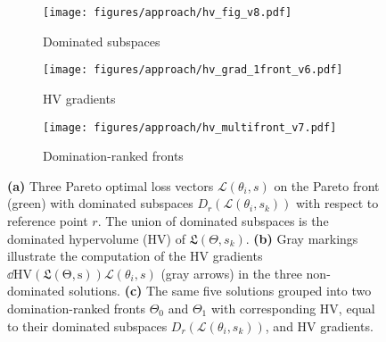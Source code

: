 \begin{figure*}
\begin{subfigure}{0.32\textwidth}
    \centering
    \texttt{[image: figures/approach/hv\_fig\_v8.pdf]}
    \caption{Dominated subspaces}
    \label{fig:hv_intuition}
\end{subfigure}
\begin{subfigure}{0.32\textwidth}
    \centering
    \texttt{[image: figures/approach/hv\_grad\_1front\_v6.pdf]}
    \caption{HV gradients}
    \label{fig:hv_grad_1front}
\end{subfigure}
\begin{subfigure}{0.32\textwidth}
    \centering
    \texttt{[image: figures/approach/hv\_multifront\_v7.pdf]}
    \caption{Domination-ranked fronts}
    \label{fig:hv_grad_intuition}
\end{subfigure}
    \centering
    \caption{\textbf{(a)} Three Pareto optimal loss vectors $\mathcal{L}(\theta_{i},s)$ on the Pareto front (green) with dominated subspaces $D_{r}(\mathcal{L}(\theta_{i},s_{k}))$ with respect to reference point $r$. The union of dominated subspaces is the dominated hypervolume (HV) of $\mathfrak{L}(\Theta,s_{k})$.
    \textbf{(b)} Gray markings illustrate the computation of the HV gradients $\dd{\mathrm{HV(\mathfrak{L}(\Theta,s))}}{\mathcal{L}(\theta_{i},s)}$ (gray arrows) in the three non-dominated solutions.
    \textbf{(c)} The same five solutions grouped into two domination-ranked fronts $\Theta_{0}$ and $\Theta_{1}$ with corresponding HV, equal to their dominated subspaces $D_{r}(\mathcal{L}(\theta_{i},s_{k}))$, and HV gradients.}
    \label{fig:hv}
\end{figure*}

